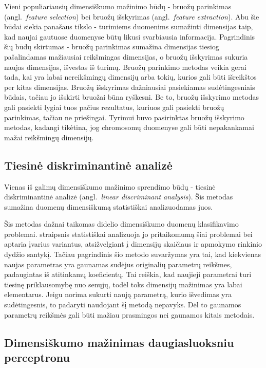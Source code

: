 \documentclass{VUMIFPSbakalaurinis}
\begin{document}
Vieni populiariausių dimensiškumo mažinimo būdų - bruožų parinkimas (angl.~\textit{feature selection}) bei bruožų išskyrimas (angl.~\textit{feature extraction}).
Abu šie būdai siekia panašaus tikslo - turimiems duomenims sumažinti dimensijas taip, kad naujai gautuose duomenyse būtų likusi svarbiausia informacija.
Pagrindinis šių būdų skirtumas - bruožų parinkimas sumažina dimensijas tiesiog pašalindamas mažiausiai reikšmingas dimensijas, o bruožų išskyrimas sukuria naujas dimensijas, išvestas iš turimų.
Bruožų parinkimo metodas veikia gerai tada, kai yra labai nereikšmingų dimensijų arba tokių, kurios gali būti išreikštos per kitas dimensijas.
Bruožų išskyrimas dažniausiai pasiekiamas sudėtingesniais būdais, tačiau jo išskirti bruožai būna ryškesni.
Be to, bruožų išskyrimo metodas gali pasiekti lygiai tuos pačius rezultatus, kuriuos gali pasiekti bruožų parinkimas, tačiau ne priešingai.
Tyrimui buvo pasirinktas bruožų išskyrimo metodas, kadangi tikėtina, jog chromosomų duomenyse gali būti nepakankamai mažai reikšmingų dimensijų.



\subsection{Tiesinė diskriminantinė analizė}

Vienas iš galimų dimensiškumo mažinimo sprendimo būdų - tiesinė diskriminantinė analizė (angl.~\textit{linear discriminant analysis}).
Šis metodas sumažina duomenų dimensiškumą statistiškai analizuodamas juos.

Šis metodas dažnai taikomas didelio dimensiškumo duomenų klasifikavimo problemai.
\cite[289~psl.]{price-dimensionality-reduction} straipsnis statistiškai analizuoja jo pritaikomumą šiai problemai bei aptaria įvarius variantus, atsižvelgiant į dimensijų skaičiaus ir apmokymo rinkinio dydžio santykį.
Tačiau pagrindinis šio metodo suvaržymas yra tai, kad kiekvienas naujas parametras yra gaunamas sudėjus originalių parametrų reikšmes, padaugintas iš atitinkamų koeficientų.
Tai reiškia, kad naujieji parametrai turi tiesinę priklausomybę nuo senųjų, todėl toks dimensijų mažinimas yra labai elementarus.
Jeigu norima sukurti naują parametrą, kurio išvedimas yra sudėtingesnis, to padaryti naudojant šį metodą nepavyks.
Dėl to gaunamos parametrų reikšmės gali būti mažiau prasmingos nei gaunamos kitais metodais.



\subsection{Dimensiškumo mažinimas daugiasluoksniu perceptronu} \label{dimensionality-reduction-perceptron}
\end{document}
